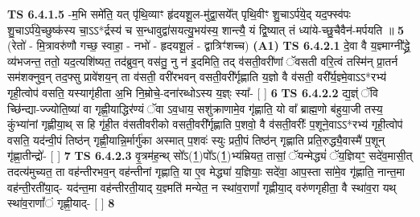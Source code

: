 \documentclass[17pt]{extarticle}
\begin{document}
                  \newline
                                \textbf{ TS 6.4.1.5} \newline
                  -म॒भि समे॑ति॒ यत् पृ॑थि॒व्याꣳ हृ॑दयशू॒ल-मु॑द्वा॒सये᳚त् पृथि॒वीꣳ शु॒चाऽर्प॑ये॒द् यद॒फ्स्व॑पः शु॒चाऽर्प॑ये॒च्छुष्क॑स्य चा॒ऽऽ*र्द्रस्य॑ च स॒न्धावुद्वा॑सयत्यु॒भय॑स्य॒ शान्त्यै॒ यं द्वि॒ष्यात् तं ध्या॑ये-च्छु॒चैवैन॑-मर्पयति ॥ \textbf{  5 } \newline
                  \newline
                      (रेतो॑ - मि॒त्रावरु॑णौ गच्छ॒ स्वाहा॒ - नभो॑ - हृदयशू॒लं - द्वात्रिꣳ॑शच्च)  \textbf{(A1)} \newline \newline
                                        \textbf{ TS 6.4.2.1} \newline
                  दे॒वा वै य॒ज्ञ्माग्नी᳚द्ध्रे॒ व्य॑भजन्त॒ ततो॒ यद॒त्यशि॑ष्यत॒ तद॑ब्रुव॒न् वस॑तु॒ नु न॑ इ॒दमिति॒ तद् व॑सती॒वरी॑णां ॅवसती वरि॒त्वं तस्मि॑न् प्रा॒तर्न सम॑शक्नुव॒न् तद॒फ्सु प्रावे॑शय॒न् ता व॑सती॒ वरी॑रभवन् वसती॒वरी᳚र्गृह्णाति य॒ज्ञो वै व॑सती॒ वरी᳚र्य॒ज्ञ्मे॒वाऽऽ*रभ्य॑ गृही॒त्वोप॑ वसति॒ यस्यागृ॑हीता अ॒भि नि॒म्रोचे॒-दना॑रब्धोऽस्य य॒ज्ञ्ः स्या᳚- [  ] \textbf{  6} \newline
                  \newline
                                \textbf{ TS 6.4.2.2} \newline
                  द्य॒ज्ञ्ं ॅवि च्छि॑न्द्या-ज्ज्योति॒ष्या॑ वा गृह्णी॒याद्धिर॑ण्यं ॅवा ऽव॒धाय॒ सशु॑क्राणामे॒व गृ॑ह्णाति॒ यो वा᳚ ब्राह्म॒णो ब॑हुया॒जी तस्य॒ कुंभ्या॑नां गृह्णीया॒थ् स हि गृ॑ही॒त व॑सतीवरीको वसती॒वरी᳚र्गृह्णाति प॒शवो॒ वै व॑सती॒वरीः᳚ प॒शूने॒वाऽऽ*रभ्य॑ गृही॒त्वोप॑ वसति॒ यद॑न्वी॒पं तिष्ठ॑न् गृह्णी॒यान्नि॒र्मार्गु॑का अस्मात् प॒शवः॑ स्युः प्रती॒पं तिष्ठ॑न् गृह्णाति प्रति॒रुद्ध्यै॒वास्मै॑ प॒शून् गृ॑ह्णा॒तीन्द्रो॑- [  ] \textbf{  7} \newline
                  \newline
                                \textbf{ TS 6.4.2.3} \newline
                  वृ॒त्रम॑ह॒न्थ् सो᳚ऽ(1॒)पो᳚ऽ(1॒)भ्य॑म्रियत॒ तासां॒ ॅयन्मेद्ध्यं॑ ॅय॒ज्ञियꣳ॒॒ सदे॑व॒मासी॒त् तदत्य॑मुच्यत॒ ता वह॑न्तीरभव॒न् वह॑न्तीनां गृह्णाति॒ या ए॒व मेद्ध्या॑ य॒ज्ञियाः॒ सदे॑वा॒ आप॒स्ता सा॑मे॒व गृ॑ह्णाति॒ नान्त॒मा वह॑न्ती॒रती॑या॒द्- यद॑न्त॒मा वह॑न्तीरती॒याद् य॒ज्ञ्मति॑ मन्येत॒ न स्था॑व॒राणां᳚ गृह्णीया॒द् वरु॑णगृहीता॒ वै स्था॑व॒रा यथ् स्था॑व॒राणां᳚ं गृह्णी॒याद्- [  ] \textbf{  8} \newline
                  \newline
\end{document}
